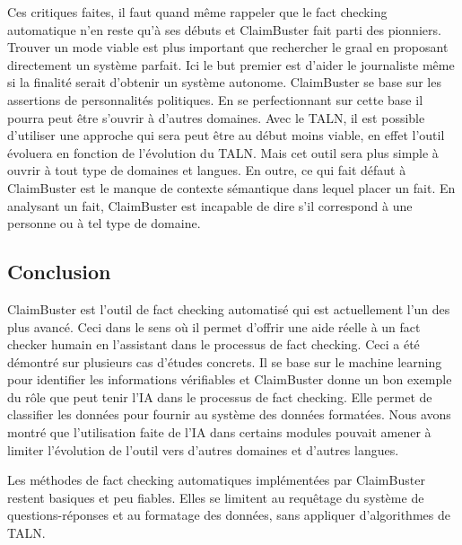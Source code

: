 Ces critiques faites, il faut quand même rappeler que le fact checking automatique n'en reste qu'à ses débuts et ClaimBuster fait parti des pionniers. Trouver un mode viable est plus important que rechercher le graal en proposant directement un système parfait. Ici le but premier est d'aider le journaliste même si la finalité serait d'obtenir un système autonome. ClaimBuster se base sur les assertions de personnalités politiques. En se perfectionnant sur cette base il pourra peut être s'ouvrir à d'autres domaines. Avec le TALN, il est possible d'utiliser une approche qui sera peut être au début moins viable, en effet l'outil évoluera en fonction de l'évolution du TALN. Mais cet outil sera plus simple à ouvrir à tout type de domaines et langues. En outre, ce qui fait défaut à ClaimBuster est le manque de contexte sémantique dans lequel placer un fait. En analysant un fait, ClaimBuster est incapable de dire s'il correspond à une personne ou à tel type de domaine.

\subsection{Conclusion}

ClaimBuster est l'outil de fact checking automatisé qui est actuellement l'un des plus avancé. Ceci dans le sens où il permet d'offrir une aide réelle à un fact checker humain en l'assistant dans le processus de fact checking. Ceci a été démontré sur plusieurs cas d'études concrets. Il se base sur le machine learning pour identifier les informations vérifiables et ClaimBuster donne un bon exemple du rôle que peut tenir l'IA dans le processus de fact checking. Elle permet de classifier les données pour fournir au système des données formatées. Nous avons montré que l'utilisation faite de l'IA dans certains modules pouvait amener à limiter l'évolution de l'outil vers d'autres domaines et d'autres langues.

Les méthodes de fact checking automatiques implémentées par ClaimBuster restent basiques et peu fiables. Elles se limitent au requêtage du système de questions-réponses et au formatage des données, sans appliquer d'algorithmes de TALN.

